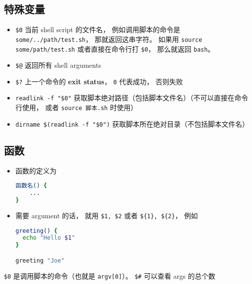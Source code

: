 \subsection{特殊变量}
\begin{itemize}
\item \verb`$0` 当前 shell script 的文件名， 例如调用脚本的命令是 \verb|some/../path/test.sh|， 那就返回这串字符。 如果用 \verb|source some/path/test.sh| 或者直接在命令行打 \verb|$0|， 那么就返回 \verb|bash|。
\item \verb`$@` 返回所有 shell arguments
\item \verb|$?| 上一个命令的 \textbf{exit status}， \verb|0| 代表成功， 否则失败
\item \verb|readlink -f "$0"| 获取脚本绝对路径（包括脚本文件名）（不可以直接在命令行使用， 或者 \verb|source 脚本.sh| 时使用）
\item \verb|dirname $(readlink -f "$0")| 获取脚本所在绝对目录（不包括脚本文件名）
\end{itemize}

\subsection{函数}

\begin{itemize}
\item 函数的定义为
\begin{lstlisting}[language=bash]
函数名() {
	...
}
\end{lstlisting}
\item 需要 argument 的话， 就用 \verb|$1, $2| 或者 \verb|${1}, ${2}|， 例如
\begin{lstlisting}[language=bash]
greeting() {
  echo "Hello $1"
}

greeting "Joe"
\end{lstlisting}
\end{itemize}

\verb|$0| 是调用脚本的命令（也就是 \verb|argv[0]|）。 \verb|$#| 可以查看 args 的总个数
